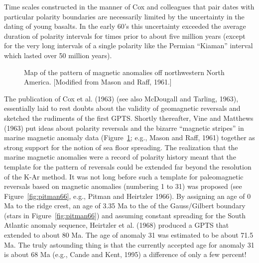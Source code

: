Time scales constructed in the manner of 
Cox and colleagues that pair dates with particular polarity boundaries are necessarily limited by the uncertainty in the dating of young basalts.    In the early 60's this uncertainty exceeded the average duration of 
polarity intervals for times prior to about five million years (except for the very long intervals of a single polarity like the Permian 
``Kiaman'' interval which lasted over 50 million years).    


\begin{figure}[htb]
\epsfxsize 9cm
\centering {}
\caption{Map of the pattern of magnetic anomalies off northwestern North America.  [Modified from Mason and Raff, 1961.]}
\label{fig:mason61}
\end{figure}



The publication of 
Cox et al. (1963) (see also 
McDougall and Tarling, 1963), \nocite{mcdougall63}  essentially laid to rest doubts about the validity of geomagnetic reversals and sketched the rudiments of the first GPTS.  Shortly thereafter,  
Vine and Matthews (1963) \nocite{vine63} put ideas about polarity reversals and the bizarre ``magnetic stripes'' in marine magnetic anomaly data (Figure~\ref{fig:mason61}; e.g., 
Mason and Raff, 1961) together \nocite{mason61}  as strong support for the notion of sea floor spreading.   The realization that the marine magnetic anomalies were a record of polarity history meant that  the template for the pattern of reversals could be extended far beyond the resolution of the K-Ar method.     It was not long before such a template for paleomagnetic reversals based on magnetic anomalies (numbering  1 to 31) was proposed (see Figure~\ref{fig:pitman66}, e.g., Pitman and Heirtzler 1966).  By assigning an age of 0 Ma to the ridge crest, an age of 3.35 Ma to the of the Gauss/Gilbert boundary (stars in  Figure~\ref{fig:pitman66}) and assuming constant spreading for the South Atlantic anomaly sequence, 
Heirtzler et al. (1968) \nocite{heirtzler68} produced a GPTS that extended to about 80 Ma. The age of anomaly 31 was estimated to be about 71.5 Ma.  The truly astounding thing is that the currently accepted age for anomaly 31 is about 68 Ma (e.g.,
 Cande and Kent, 1995) \nocite{cande95} a difference of only a few percent!      


